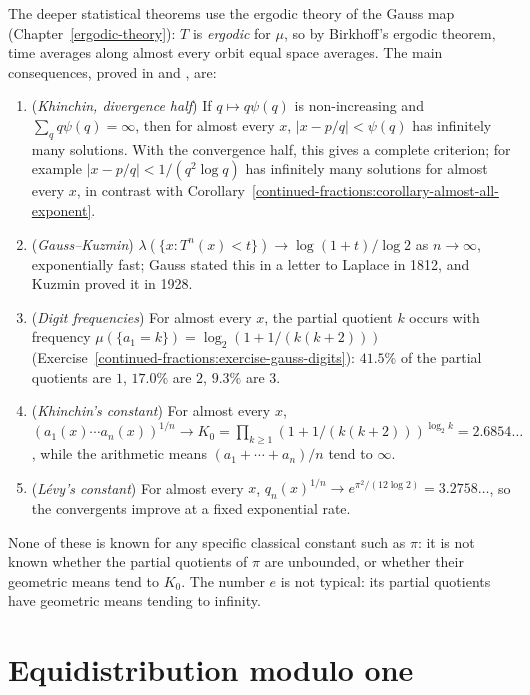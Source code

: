 \begin{remark}\label{continued-fractions:remark-metric-results}
The deeper statistical theorems use the ergodic theory of the Gauss map (Chapter~\ref{ergodic-theory}): $T$ is \emph{ergodic} for $\mu$, so by Birkhoff's ergodic theorem, time averages along almost
every orbit equal space averages. The main consequences, proved in \cite{khinchin-continued-fractions} and \cite{einsiedler-ward}, are:
\begin{enumerate}
\item (\emph{Khinchin, divergence half}) If $q \mapsto q\psi(q)$ is non-increasing and $\sum_qq\psi(q) = \infty$, then for almost every $x$, $|x - p/q| < \psi(q)$ has infinitely many solutions. With the
convergence half, this gives a complete criterion; for example $|x - p/q| < 1/(q^2\log q)$ has infinitely many solutions for almost every $x$, in contrast with
Corollary~\ref{continued-fractions:corollary-almost-all-exponent}.
\item (\emph{Gauss--Kuzmin}) $\lambda(\{x : T^n(x) < t\}) \to \log(1 + t)/\log 2$ as $n \to \infty$, exponentially fast; Gauss stated this in a letter to Laplace in 1812, and Kuzmin proved it in 1928.
\item (\emph{Digit frequencies}) For almost every $x$, the partial quotient $k$ occurs with frequency $\mu(\{a_1 = k\}) = \log_2(1 + 1/(k(k + 2)))$ (Exercise~\ref{continued-fractions:exercise-gauss-digits}): $41.5\%$
of the partial quotients are $1$, $17.0\%$ are $2$, $9.3\%$ are $3$.
\item (\emph{Khinchin's constant}) For almost every $x$, $(a_1(x)\cdots a_n(x))^{1/n} \to K_0 = \prod_{k \geq 1}(1 + 1/(k(k + 2)))^{\log_2k} = 2.6854\ldots$, while the arithmetic means
$(a_1 + \cdots + a_n)/n$ tend to $\infty$.
\item (\emph{Lévy's constant}) For almost every $x$, $q_n(x)^{1/n} \to e^{\pi^2/(12\log 2)} = 3.2758\ldots$, so the convergents improve at a fixed exponential rate.
\end{enumerate}
None of these is known for any specific classical constant such as $\pi$: it is not known whether the partial quotients of $\pi$ are unbounded, or whether their geometric means tend to $K_0$. The
number $e$ is not typical: its partial quotients have geometric means tending to infinity.
\end{remark}

\section{Equidistribution modulo one}\label{continued-fractions:section-equidistribution}

